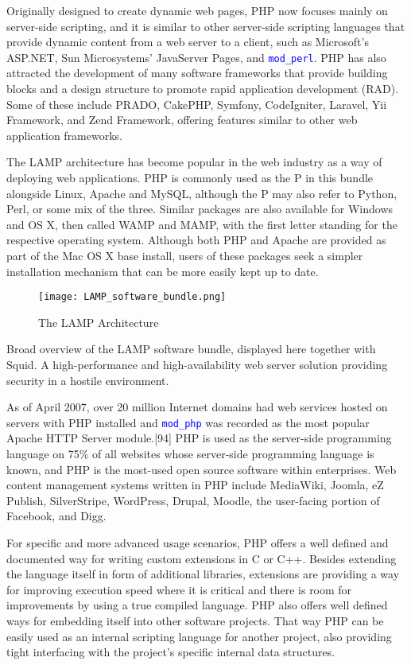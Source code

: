 Originally designed to create dynamic web pages, PHP now focuses mainly on server-side scripting, and it is similar to other server-side scripting languages that provide dynamic content from a web server to a client, such as Microsoft's ASP.NET, Sun Microsystems' JavaServer Pages, and \textcolor{Blue}{\texttt{mod\_perl}}. PHP has also attracted the development of many software frameworks that provide building blocks and a design structure to promote rapid application development (RAD). Some of these include PRADO, CakePHP, Symfony, CodeIgniter, Laravel, Yii Framework, and Zend Framework, offering features similar to other web application frameworks.

The LAMP architecture has become popular in the web industry as a way of deploying web applications. PHP is commonly used as the P in this bundle alongside Linux, Apache and MySQL, although the P may also refer to Python, Perl, or some mix of the three. Similar packages are also available for Windows and OS X, then called WAMP and MAMP, with the first letter standing for the respective operating system. Although both PHP and Apache are provided as part of the Mac OS X base install, users of these packages seek a simpler installation mechanism that can be more easily kept up to date.

\begin{figure}[!h]
\centering
\texttt{[image: LAMP\_software\_bundle.png]}
\caption{The LAMP Architecture}
\label{LAMP_software_bundle}
\end{figure}

Broad overview of the LAMP software bundle, displayed here together with Squid. A high-performance and high-availability web server solution providing security in a hostile environment.

As of April 2007, over 20 million Internet domains had web services hosted on servers with PHP installed and \textcolor{Blue}{\texttt{mod\_php}} was recorded as the most popular Apache HTTP Server module.[94] PHP is used as the server-side programming language on 75\% of all websites whose server-side programming language is known, and PHP is the most-used open source software within enterprises. Web content management systems written in PHP include MediaWiki, Joomla, eZ Publish, SilverStripe, WordPress, Drupal, Moodle, the user-facing portion of Facebook, and Digg.

For specific and more advanced usage scenarios, PHP offers a well defined and documented way for writing custom extensions in C or C++. Besides extending the language itself in form of additional libraries, extensions are providing a way for improving execution speed where it is critical and there is room for improvements by using a true compiled language. PHP also offers well defined ways for embedding itself into other software projects. That way PHP can be easily used as an internal scripting language for another project, also providing tight interfacing with the project's specific internal data structures.


